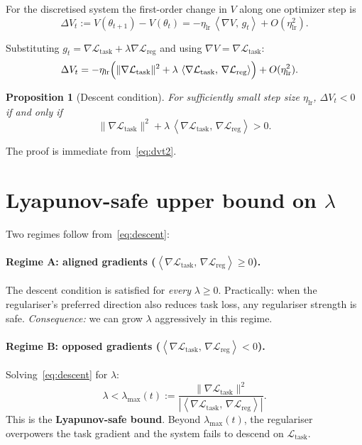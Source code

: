 \documentclass[11pt,a4paper]{article}
\newtheorem{proposition}{Proposition}
\newcommand{\inner}[2]{\left\langle #1,\, #2 \right\rangle}
\newcommand{\Ltask}{\mathcal{L}_{\text{task}}}
\newcommand{\Lreg}{\mathcal{L}_{\text{reg}}}
\begin{document}
For the discretised system the first-order change in $V$ along one
optimizer step is
\begin{equation}
\Delta V_t := V(\theta_{t+1}) - V(\theta_t)
= -\eta_{\text{lr}} \, \inner{\nabla V}{g_t} + O(\eta_{\text{lr}}^2).
\label{eq:dvt}
\end{equation}

Substituting $g_t = \nabla \Ltask + \lambda \nabla \Lreg$ and using
$\nabla V = \nabla \Ltask$:
\begin{align}
\Delta V_t
   &= -\eta_{\text{lr}}\Bigl(
        \|\nabla\Ltask\|^2
      + \lambda\, \inner{\nabla\Ltask}{\nabla\Lreg}
      \Bigr) + O(\eta_{\text{lr}}^2). \label{eq:dvt2}
\end{align}

\begin{proposition}[Descent condition]
\label{prop:descent}
For sufficiently small step size $\eta_{\text{lr}}$,
$\Delta V_t < 0$ if and only if
\begin{equation}
\|\nabla\Ltask\|^2
+ \lambda\, \inner{\nabla\Ltask}{\nabla\Lreg} > 0. \label{eq:descent}
\end{equation}
\end{proposition}

The proof is immediate from~\eqref{eq:dvt2}.

\section{Lyapunov-safe upper bound on $\lambda$}

Two regimes follow from~\eqref{eq:descent}:

\paragraph{Regime A: aligned gradients ($\inner{\nabla\Ltask}{\nabla\Lreg} \geq 0$).}
The descent condition is satisfied for \emph{every} $\lambda \geq 0$.
Practically: when the regulariser's preferred direction also reduces
task loss, any regulariser strength is safe. \emph{Consequence:} we
can grow $\lambda$ aggressively in this regime.

\paragraph{Regime B: opposed gradients ($\inner{\nabla\Ltask}{\nabla\Lreg} < 0$).}
Solving~\eqref{eq:descent} for $\lambda$:
\begin{equation}
\lambda < \lambda_{\max}(t) := \frac{\|\nabla\Ltask\|^2}
                                    {|\inner{\nabla\Ltask}{\nabla\Lreg}|}.
\label{eq:lambdamax}
\end{equation}
This is the \textbf{Lyapunov-safe bound}. Beyond $\lambda_{\max}(t)$,
the regulariser overpowers the task gradient and the system fails to
descend on $\Ltask$.
\end{document}

